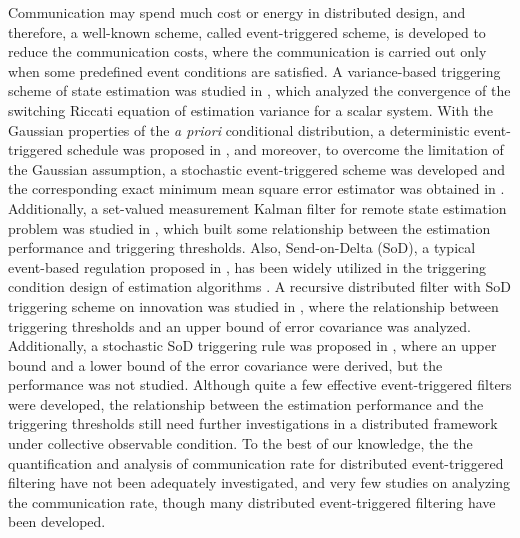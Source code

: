 \documentclass[journal,transmag]{IEEEtran}
\begin{document}
	Communication may spend much cost or energy in distributed design, and therefore, a well-known scheme, called event-triggered scheme, is developed to reduce the communication costs, where the communication is carried out only when some predefined event conditions are satisfied.
	{A variance-based triggering  scheme of state estimation was studied in \cite{trimpe2014event}, which analyzed the convergence of the switching Riccati equation of estimation variance   for a scalar system.}
	With the Gaussian properties of the \textit{a priori} conditional distribution, a deterministic event-triggered schedule was proposed in \cite{wu2013event}, and moreover, to overcome the limitation of the Gaussian assumption, a stochastic event-triggered scheme was developed and the corresponding exact minimum mean square error estimator was obtained in \cite{HanTacStochasEV}.  Additionally, a set-valued measurement Kalman filter  for remote state estimation problem was studied in   \cite{shi2015set}, which built some relationship between the estimation performance and triggering thresholds.
	Also, Send-on-Delta (SoD), a typical event-based regulation proposed in \cite{miskowicz2006send}, has been widely utilized in the triggering condition design of estimation algorithms \cite{liu2015event,andren2016event,nguyen2007improving}.
	A recursive distributed filter with SoD triggering scheme on innovation was studied in \cite{liu2015event}, where the relationship between triggering thresholds and an upper bound of error covariance was analyzed. Additionally, a stochastic SoD triggering rule was proposed in \cite{andren2016event}, where an upper bound and a lower bound of the error covariance were derived, but the performance was not studied.
	Although quite a few effective event-triggered filters were developed, the  relationship between the estimation performance and the triggering thresholds still need further investigations in a distributed framework under collective observable condition.
To the best of our knowledge, the the quantification and analysis of communication rate for distributed event-triggered filtering have not been adequately investigated, and very few studies on analyzing the communication rate, though many distributed event-triggered filtering have been developed.
\end{document}
